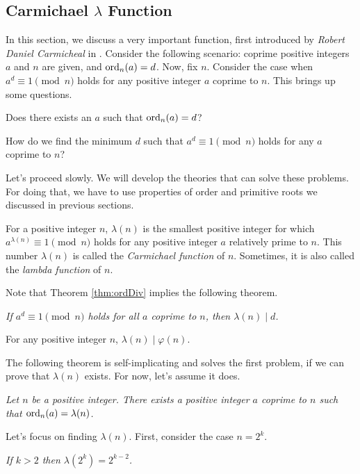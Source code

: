 \documentclass{subfile}
\begin{document}
	\subsection{Carmichael $\lambda$ Function}
	In this section, we discuss a very important function, first introduced by \textit{Robert Daniel Carmicheal} in  \cite{ch:congruence-carmichael-original}. Consider the following scenario: coprime positive integers $a$ and $n$ are given, and $\operatorname{ord}_n(a)=d$. Now, fix $n$. Consider the case when $a^d\equiv1\pmod n$ holds for any positive integer $a$ coprime to $n$. This brings up some questions.
	\begin{problem}\label{prob:CarmichaelQuestion1}
		Does there exists an $a$ such that $\operatorname{ord}_n(a)=d$?
	\end{problem}
	
	\begin{problem}\label{prob:CarmichaelQuestion2}
		How do we find the minimum $d$ such that $a^d\equiv1\pmod n$ holds for any $a$ coprime to $n$?
	\end{problem}
	Let's proceed slowly. We will develop the theories that can solve these problems. For doing that, we have to use properties of order and primitive roots we discussed in previous sections.
	\begin{definition}
		For a positive integer $n$, $\lambda(n)$ is the smallest positive integer for which $a^{\lambda(n)}\equiv1\pmod n$ holds for any positive integer $a$ relatively prime to $n$. This number $\lambda(n)$ is called the \textit{Carmichael function} of $n$. Sometimes, it is also called the \textit{lambda function} of $n$.
	\end{definition}
	Note that Theorem \eqref{thm:ordDiv} implies the following theorem.
	\begin{theorem}\slshape\label{thm:carDiv}
		If $a^d\equiv1\pmod n$ holds for all $a$ coprime to $n$, then $\lambda(n)\mid d$.
	\end{theorem}
	
	\begin{corollary}\label{cor:LambdaDividesPhi}
		For any positive integer $n$, $\lambda(n)\mid \varphi(n)$.
	\end{corollary}
	The following theorem is self-implicating and solves the first problem, if we can prove that $\lambda(n)$ exists. For now, let's assume it does.
	\begin{theorem}\slshape
		Let $n$ be a positive integer. There exists a positive integer $a$ coprime to $n$ such that $\operatorname{ord}_n(a)=\lambda(n)$.
	\end{theorem}
	Let's focus on finding $\lambda(n)$. First, consider the case $n=2^k$.
	\begin{theorem}\slshape
		If $k>2$ then $\lambda(2^k)=2^{k-2}$.
	\end{theorem}
	
\end{document}
